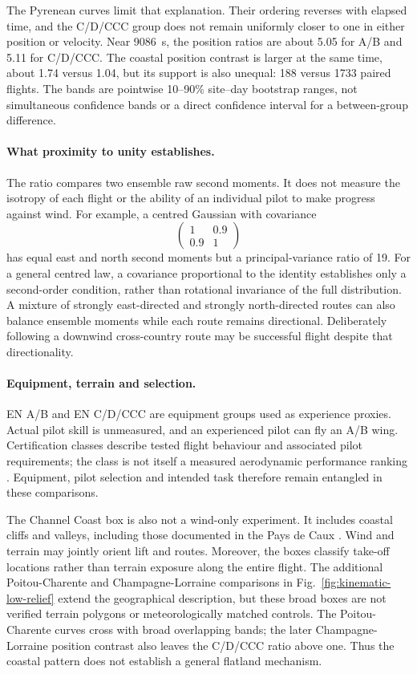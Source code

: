 The Pyrenean curves limit that explanation. Their ordering reverses with elapsed
time, and the C/D/CCC group does not remain uniformly closer to one in either
position or velocity. Near \SI{9086}{\second}, the position ratios are about
\num{5.05} for A/B and \num{5.11} for C/D/CCC. The coastal position contrast is
larger at the same time, about \num{1.74} versus \num{1.04}, but its support is
also unequal: \num{188} versus \num{1733} paired flights. The bands are pointwise
10--90\% site--day bootstrap ranges, not simultaneous confidence bands or a direct
confidence interval for a between-group difference.

\paragraph{What proximity to unity establishes.}
The ratio compares two ensemble raw second moments. It does not measure the
isotropy of each flight or the ability of an individual pilot to make progress
against wind. For example, a centred Gaussian with covariance
\[
 \begin{pmatrix}1&0.9\\0.9&1\end{pmatrix}
\]
has equal east and north second moments but a principal-variance ratio of 19.
For a general centred law, a covariance proportional to the identity establishes
only a second-order condition, rather than rotational invariance of the full
distribution. A mixture
of strongly east-directed and strongly north-directed routes can also balance
ensemble moments while each route remains directional. Deliberately following a
downwind cross-country route may be successful flight despite that directionality.

\paragraph{Equipment, terrain and selection.}
EN A/B and EN C/D/CCC are equipment groups used as experience proxies. Actual pilot
skill is unmeasured, and an experienced pilot can fly an A/B wing. Certification
classes describe tested flight behaviour and associated pilot requirements; the
class is not itself a measured aerodynamic performance ranking
\cite{dhv_classification}. Equipment, pilot selection and intended task therefore
remain entangled in these comparisons.

The Channel Coast box is also not a wind-only experiment. It includes coastal
cliffs and valleys, including those documented in the Pays de Caux
\cite{dreal_pays_de_caux}. Wind and terrain may jointly orient lift and routes.
Moreover, the boxes classify take-off locations rather than terrain exposure along
the entire flight. The additional Poitou-Charente and Champagne-Lorraine comparisons
in Fig.~\ref{fig:kinematic-low-relief} extend the geographical description, but these
broad boxes are not verified terrain polygons or meteorologically matched controls.
The Poitou-Charente curves cross with broad overlapping bands; the later
Champagne-Lorraine position contrast also leaves the C/D/CCC ratio above one.
Thus the coastal pattern does not establish a general flatland mechanism.

